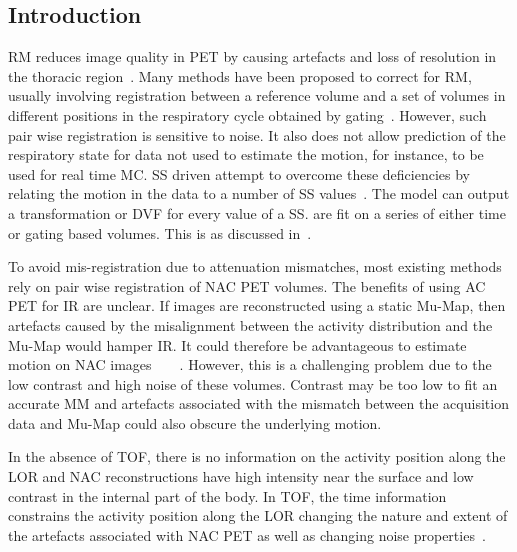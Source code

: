         \subsection{Introduction} \label{sec:impact_of_tof_on_respiratory_motion_model_estimation_using_pre_gated_no_intra_cycle_motion_nac_pet_introduction}
        \gls{RM} reduces image quality in \gls{PET} by causing artefacts and loss of resolution in the thoracic region~. Many methods have been proposed to correct for \gls{RM}, usually involving registration between a reference volume and a set of volumes in different positions in the respiratory cycle obtained by gating~. However, such pair wise registration is sensitive to noise. It also does not allow prediction of the respiratory state for data not used to estimate the motion, for instance, to be used for real time \gls{MC}. \gls{SS} driven  attempt to overcome these deficiencies by relating the motion in the data to a number of \gls{SS} values~. The model can output a transformation or \gls{DVF} for every value of a \gls{SS}.  are fit on a series of either time or gating based volumes. This is as discussed in~.

        To avoid mis-registration due to attenuation mismatches, most existing methods rely on pair wise registration of \gls{NAC} \gls{PET} volumes. The benefits of using \gls{AC} \gls{PET} for \gls{IR} are unclear. If images are reconstructed using a static \gls{Mu-Map}, then artefacts caused by the misalignment between the activity distribution and the \gls{Mu-Map} would hamper \gls{IR}. It could therefore be advantageous to estimate motion on \gls{NAC} images~~~~. However, this is a challenging problem due to the low contrast and high noise of these volumes. Contrast may be too low to fit an accurate \gls{MM} and artefacts associated with the mismatch between the acquisition data and \gls{Mu-Map} could also obscure the underlying motion.
        
        In the absence of \gls{TOF}, there is no information on the activity position along the \gls{LOR} and \gls{NAC} reconstructions have high intensity near the surface and low contrast in the internal part of the body. In \gls{TOF}, the time information constrains the activity position along the \gls{LOR} changing the nature and extent of the artefacts associated with \gls{NAC} \gls{PET} as well as changing noise properties~.
        
